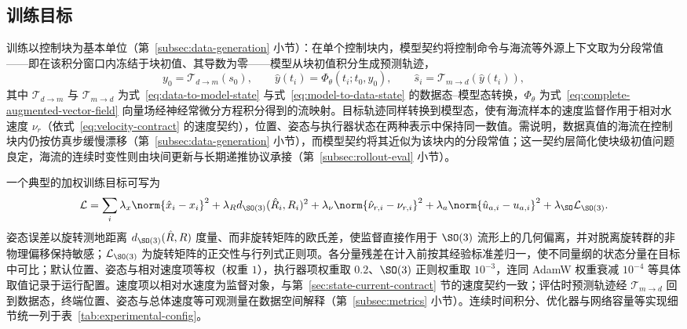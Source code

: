 \subsection{训练目标}
\label{subsec:training-objective}

训练以控制块为基本单位（第~\ref{subsec:data-generation} 小节）：在单个控制块内，模型契约将控制命令与海流等外源上下文取为分段常值——即在该积分窗口内冻结于块初值、其导数为零——模型从块初值积分生成预测轨迹，
\begin{equation}
  y_0=\mathcal{T}_{d\to m}(s_0),\qquad
  \hat y(t_i)=\Phi_\theta(t_i;t_0,y_0),\qquad
  \hat s_i=\mathcal{T}_{m\to d}(\hat y(t_i)),
  \label{eq:block-prediction}
\end{equation}
其中 \(\mathcal{T}_{d\to m}\) 与 \(\mathcal{T}_{m\to d}\) 为式~\eqref{eq:data-to-model-state} 与式~\eqref{eq:model-to-data-state} 的数据态--模型态转换，\(\Phi_\theta\) 为式~\eqref{eq:complete-augmented-vector-field} 向量场经神经常微分方程积分得到的流映射。目标轨迹同样转换到模型态，使有海流样本的速度监督作用于相对水速度 \(\nu_r\)（依式~\eqref{eq:velocity-contract} 的速度契约），位置、姿态与执行器状态在两种表示中保持同一数值。需说明，数据真值的海流在控制块内仍按仿真步缓慢漂移（第~\ref{subsec:data-generation} 小节），而模型契约将其近似为该块内的分段常值；这一契约层简化使块级初值问题良定，海流的连续时变性则由块间更新与长期递推协议承接（第~\ref{subsec:rollout-eval} 小节）。

一个典型的加权训练目标可写为
\begin{equation}
  \mathcal{L}
  =
  \sum_i
  \lambda_x\norm{\hat x_i-x_i}^2
  +\lambda_R d_{\SO(3)}(\hat R_i,R_i)^2
  +\lambda_\nu\norm{\hat\nu_{r,i}-\nu_{r,i}}^2
  +\lambda_a\norm{\hat u_{a,i}-u_{a,i}}^2
  +\lambda_{\SO}\mathcal{L}_{\SO(3)} .
  \label{eq:training-loss}
\end{equation}
姿态误差以旋转测地距离 \(d_{\SO(3)}(\hat R,R)\) 度量、而非旋转矩阵的欧氏差，使监督直接作用于 \(\SO(3)\) 流形上的几何偏离，并对脱离旋转群的非物理偏移保持敏感；\(\mathcal{L}_{\SO(3)}\) 为旋转矩阵的正交性与行列式正则项。各分量残差在计入前按其经验标准差归一，使不同量纲的状态分量在目标中可比；默认位置、姿态与相对速度项等权（权重 \(1\)），执行器项权重取 \(0.2\)、\(\SO(3)\) 正则权重取 \(10^{-3}\)，连同 AdamW 权重衰减 \(10^{-4}\) 等具体取值记录于运行配置。速度项以相对水速度为监督对象，与第~\ref{sec:state-current-contract} 节的速度契约一致；评估时预测轨迹经 \(\mathcal{T}_{m\to d}\) 回到数据态，终端位置、姿态与总体速度等可观测量在数据空间解释（第~\ref{subsec:metrics} 小节）。连续时间积分、优化器与网络容量等实现细节统一列于表~\ref{tab:experimental-config}。

